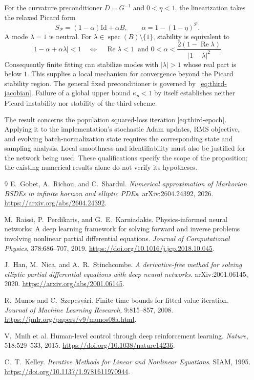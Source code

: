 \documentclass[11pt]{article}
\newcommand{\PP}{\mathcal P}
\newcommand{\Id}{\mathrm{Id}}
\begin{document}
For the curvature preconditioner $D=G^{-1}$ and $0<\eta<1$, the
linearization takes the relaxed Picard form
\begin{equation}
 S_\PP=(1-\alpha)\Id+\alpha B,
 \qquad \alpha=1-(1-\eta)^\PP.                           \label{eq:third-relaxation}
\end{equation}
A mode $\lambda=1$ is neutral. For
$\lambda\in\operatorname{spec}(B)\setminus\{1\}$, stability is equivalent to
\begin{equation}
 |1-\alpha+\alpha\lambda|<1
 \quad\Longleftrightarrow\quad
 \operatorname{Re}\lambda<1\ \text{ and }
 0<\alpha<\frac{2(1-\operatorname{Re}\lambda)}{|1-\lambda|^2}.
                                                        \label{eq:third-region}
\end{equation}
Consequently finite fitting can stabilize modes with $|\lambda|>1$
whose real part is below $1$. This supplies a local mechanism for
convergence beyond the Picard stability region. The general fixed
preconditioner is governed by~\eqref{eq:third-jacobian}. Failure of a
global upper bound $\kappa_p<1$ by itself establishes neither Picard
instability nor stability of the third scheme.

The result concerns the population squared-loss iteration
\eqref{eq:third-epoch}. Applying it to the implementation's stochastic
Adam updates, RMS objective, and evolving batch-normalization state
requires the corresponding state and sampling analysis. Local smoothness
and identifiability must also be justified for the network being used.
These qualifications specify the scope of the proposition; the existing
numerical results alone do not verify its hypotheses.

\begin{thebibliography}{9}
E.~Gobet, A.~Richou, and C.~Shardul.
\emph{Numerical approximation of Markovian BSDEs in infinite horizon
and elliptic PDEs}. arXiv:2604.24392, 2026.
\url{https://arxiv.org/abs/2604.24392}.

M.~Raissi, P.~Perdikaris, and G.~E.~Karniadakis.
Physics-informed neural networks: A deep learning framework for solving
forward and inverse problems involving nonlinear partial differential
equations. \emph{Journal of Computational Physics}, 378:686--707, 2019.
\url{https://doi.org/10.1016/j.jcp.2018.10.045}.

J.~Han, M.~Nica, and A.~R.~Stinchcombe.
\emph{A derivative-free method for solving elliptic partial
differential equations with deep neural networks}.
arXiv:2001.06145, 2020.
\url{https://arxiv.org/abs/2001.06145}.

R.~Munos and C.~Szepesv\'ari.
Finite-time bounds for fitted value iteration.
\emph{Journal of Machine Learning Research}, 9:815--857, 2008.
\url{https://jmlr.org/papers/v9/munos08a.html}.

V.~Mnih et al.
Human-level control through deep reinforcement learning.
\emph{Nature}, 518:529--533, 2015.
\url{https://doi.org/10.1038/nature14236}.

C.~T.~Kelley.
\emph{Iterative Methods for Linear and Nonlinear Equations}.
SIAM, 1995.
\url{https://doi.org/10.1137/1.9781611970944}.
\end{thebibliography}
\end{document}
